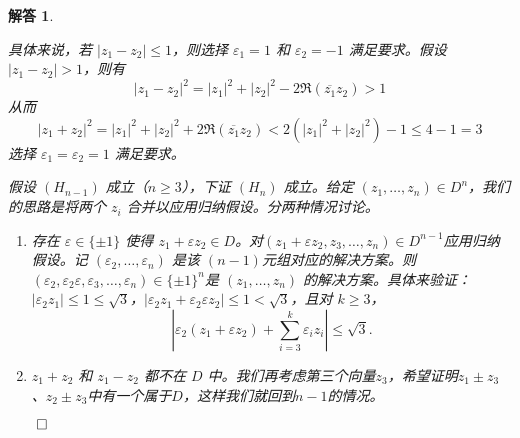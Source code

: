 \documentclass[12pt,UTF8]{ctexbook}
\theoremstyle{exercisestyle}
\theoremstyle{solutionstyle}
\newtheorem*{solution*}{解答}
\newenvironment{solution}
  {\begin{solution*}}
  {\hfill\ensuremath{\qed}\end{solution*}}
\begin{document}
\begin{solution}
\begin{subquestions}
\begin{minipage}[t]{0.4\textwidth}
\end{minipage}

具体来说，若 \( |z_1 - z_2| \leqslant 1 \)，则选择 \( \varepsilon_1 = 1 \) 和 \( \varepsilon_2 = -1 \) 满足要求。假设 \( |z_1 - z_2| > 1 \)，则有
\[
|z_1 - z_2|^2 = |z_1|^2 + |z_2|^2 - 2 \Re(\overline{z_1} z_2) > 1
\]
从而
\[
|z_1 + z_2|^2 = |z_1|^2 + |z_2|^2 + 2 \Re(\overline{z_1} z_2) < 2(|z_1|^2 + |z_2|^2) - 1 \leqslant 4 - 1 = 3
\]
选择 \( \varepsilon_1 = \varepsilon_2 = 1 \) 满足要求。


假设 \( (H_{n-1}) \) 成立（\( n \geq 3 \)），下证 \( (H_{n}) \) 成立。给定 \( (z_1, \ldots, z_n) \in D^n \)，我们的思路是将两个 \( z_i \) 合并以应用归纳假设。分两种情况讨论。
\begin{enumerate}[label=\arabic*.]
  \item 存在 \( \varepsilon \in \{\pm 1\} \) 使得 \( z_1 + \varepsilon z_2 \in D \)。对\( (z_1 + \varepsilon z_2, z_3, \ldots, z_n) \in D^{n-1} \)应用归纳假设。记 \( (\varepsilon_2, \ldots, \varepsilon_n) \) 是该 \( (n-1) \)元组对应的解决方案。则 \( (\varepsilon_2, \varepsilon_2 \varepsilon, \varepsilon_3, \ldots, \varepsilon_n) \in \{\pm 1\}^n \)是 \( (z_1, \ldots, z_n) \) 的解决方案。具体来验证：\( |\varepsilon_2 z_1| \leqslant 1 \leqslant \sqrt{3} \)，\( |\varepsilon_2 z_1 + \varepsilon_2 \varepsilon z_2| \leqslant 1 < \sqrt{3} \)，且对 \( k \geqslant 3 \)，
    \[
    \left| \varepsilon_2(z_1 + \varepsilon z_2) + \sum_{i=3}^k \varepsilon_i z_i \right| \leqslant \sqrt{3}.
    \]
  \item \( z_1 + z_2 \) 和 \( z_1 - z_2 \) 都不在 \( D \) 中。我们再考虑第三个向量$z_3$，希望证明\( z_1 \pm z_3 \)、\( z_2 \pm z_3 \)中有一个属于$D$，这样我们就回到$n-1$的情况。

\vspace{4pt}
\begin{minipage}[t]{0.4\textwidth}
\centering
{}
\end{minipage}
\end{enumerate}
\end{subquestions}
\end{solution}
\end{document}
